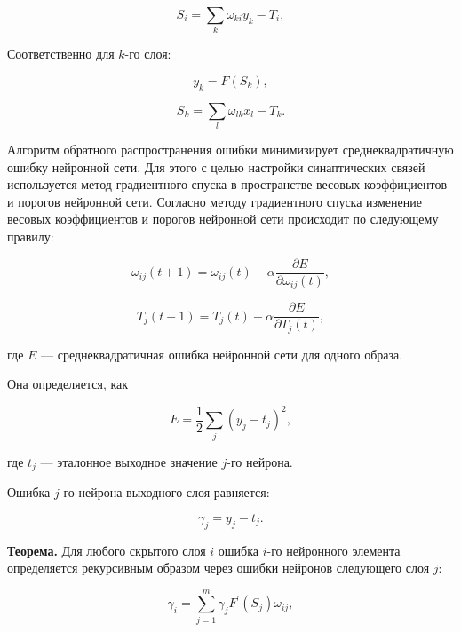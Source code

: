 \begin{equation}
    S_i = \sum_{k}{\omega_{k i} y_k - T_i},
\end{equation}

Соответственно для $k$-го слоя:

\begin{equation}
    y_k = F(S_k),
\end{equation}

\begin{equation}
    S_k = \sum_{l}{\omega_{l k} x_l - T_k}.
\end{equation}

Алгоритм обратного распространения ошибки минимизирует среднеквадратичную ошибку нейронной сети. Для этого с целью настройки синаптических связей используется метод градиентного спуска в пространстве весовых коэффициентов и порогов нейронной сети. Согласно методу градиентного спуска изменение весовых коэффициентов и порогов нейронной сети происходит по следующему правилу:

\begin{equation}
    \omega_{i j}(t + 1) = \omega_{i j}(t) - \alpha\frac{\partial E}{\partial\omega_{i j}(t)},
\end{equation}

\begin{equation}
    T_j(t + 1) = T_j(t) - \alpha\frac{\partial E}{\partial T_j(t)},
\end{equation}

где $E$ — среднеквадратичная ошибка нейронной сети для одного образа.

Она определяется, как

\begin{equation}
    E = \frac{1}{2} \sum_{j}{(y_j - t_j)^2},
\end{equation}

где $t_j$ — эталонное выходное значение $j$-го нейрона.

Ошибка $j$-го нейрона выходного слоя равняется:

\begin{equation}
    \gamma_j = y_j - t_j.
\end{equation}

\textbf{Теорема.} Для любого скрытого слоя $i$ ошибка $i$-го нейронного элемента определяется рекурсивным образом через ошибки нейронов следующего слоя $j$:

\begin{equation}
    \gamma_i = \sum_{j = 1}^{m}{\gamma_j F^\prime(S_j)\omega_{i j},}
\end{equation}

